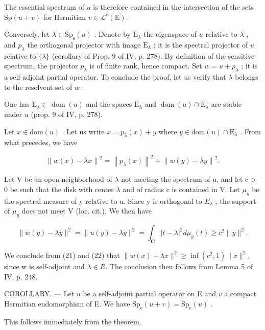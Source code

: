 The essential spectrum of \(u\) is therefore contained in the intersection of the sets \(\mathrm{Sp}(u + v)\) for Hermitian \(v \in \mathcal{L}^{\mathrm{c}}(\mathrm{E})\).

Conversely, let \(\lambda \in \mathrm{Sp}_{\mathrm{s}}(u)\) . Denote by \(\mathrm{E}_{\lambda}\) the eigenspace of \(u\) relative to \(\lambda\) , and \(p_{\lambda}\) the orthogonal projector with image \(\mathrm{E}_{\lambda}\) ; it is the spectral projector of \(u\) relative to \(\{\lambda\}\) (corollary of Prop. 9 of IV, p. 278). By definition of the sensitive spectrum, the projector \(p_{\lambda}\) is of finite rank, hence compact. Set \(w = u + p_{\lambda}\) ; it is a self-adjoint partial operator. To conclude the proof, let us verify that \(\lambda\) belongs to the resolvent set of \(w\) .

One has \(\mathrm{E}_{\lambda} \subset \operatorname{dom}(u)\) and the spaces \(\mathrm{E}_{\lambda}\) and \(\operatorname{dom}(u) \cap \mathrm{E}_{\lambda}^{\circ}\) are stable under \(u\) (prop. 9 of IV, p. 278).

Let \(x \in \text{dom}(u)\) . Let us write \(x = p_{\lambda}(x) + y\) where \(y \in \text{dom}(u) \cap \text{E}_{\lambda}^{\circ}\) . From what precedes, we have

\[
\left\| w (x) - \lambda x \right\| ^ {2} = \left\| p _ {\lambda} (x) \right\| ^ {2} + \left\| w (y) - \lambda y \right\| ^ {2}.\tag{21}
\]

Let V be an open neighborhood of \(\lambda\) not meeting the spectrum of u, and let c > 0 be such that the disk with center \(\lambda\) and of radius c is contained in V. Let \(\mu_{y}\) be the spectral measure of y relative to u. Since y is orthogonal to \(E_{\lambda}\) , the support of \(\mu_{y}\) does not meet V (loc. cit.). We then have

\[
\| w (y) - \lambda y \| ^ {2} = \| u (y) - \lambda y \| ^ {2} = \int_ {\mathbf {C}} | t - \lambda | ^ {2} d \mu_ {y} (t) \geqslant c ^ {2} \| y \| ^ {2}.\tag{22}
\]

We conclude from (21) and (22) that \(\|w(x)-\lambda x\|^{2}\geqslant\inf(c^{2},1)\|x\|^{2}\), since w is self-adjoint and \(\lambda\in R\). The conclusion then follows from Lemma 5 of IV, p. 248.

COROLLARY. --- Let \(u\) be a self-adjoint partial operator on E and \(v\) a compact Hermitian endomorphism of E. We have \(\mathrm{Sp}_{\mathrm{e}}(u + v) = \mathrm{Sp}_{\mathrm{e}}(u)\) .

This follows immediately from the theorem.

